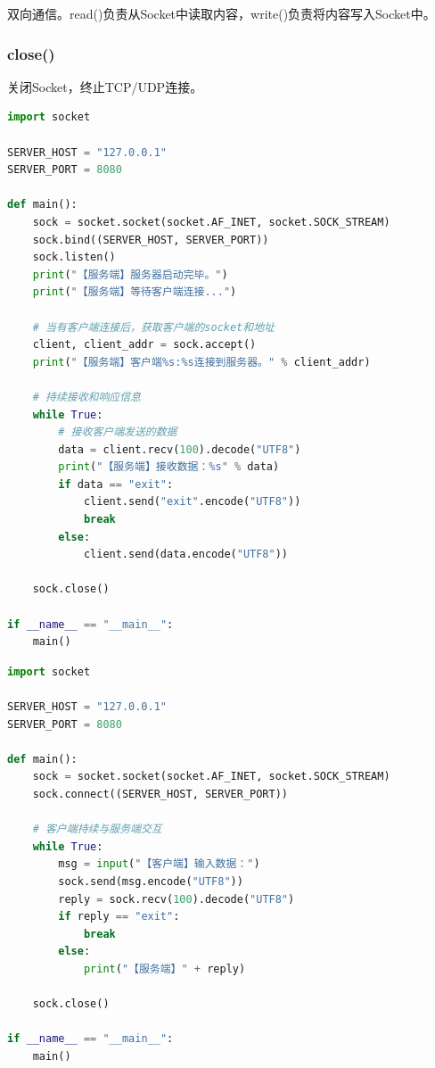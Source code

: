 双向通信。read()负责从Socket中读取内容，write()负责将内容写入Socket中。\\

\subsubsection{close()}

关闭Socket，终止TCP/UDP连接。\\


\begin{lstlisting}[language=Python, title=tcp\_server.py]
import socket

SERVER_HOST = "127.0.0.1"
SERVER_PORT = 8080

def main():
    sock = socket.socket(socket.AF_INET, socket.SOCK_STREAM)
    sock.bind((SERVER_HOST, SERVER_PORT))
    sock.listen()
    print("【服务端】服务器启动完毕。")
    print("【服务端】等待客户端连接...")

    # 当有客户端连接后，获取客户端的socket和地址
    client, client_addr = sock.accept()
    print("【服务端】客户端%s:%s连接到服务器。" % client_addr)

    # 持续接收和响应信息
    while True:
        # 接收客户端发送的数据
        data = client.recv(100).decode("UTF8")
        print("【服务端】接收数据：%s" % data)
        if data == "exit":
            client.send("exit".encode("UTF8"))
            break
        else:
            client.send(data.encode("UTF8"))
    
    sock.close()

if __name__ == "__main__":
    main()    
\end{lstlisting}

\begin{lstlisting}[language=Python, title=tcp\_client.py]
import socket

SERVER_HOST = "127.0.0.1"
SERVER_PORT = 8080

def main():
    sock = socket.socket(socket.AF_INET, socket.SOCK_STREAM)
    sock.connect((SERVER_HOST, SERVER_PORT))

    # 客户端持续与服务端交互
    while True:     
        msg = input("【客户端】输入数据：")
        sock.send(msg.encode("UTF8"))
        reply = sock.recv(100).decode("UTF8")
        if reply == "exit":
            break
        else:
            print("【服务端】" + reply)

    sock.close()

if __name__ == "__main__":
    main()
\end{lstlisting}

